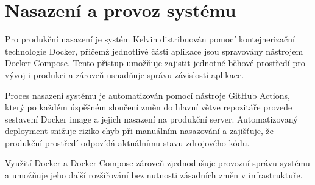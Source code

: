 \section{Nasazení a provoz systému}
\label{sec:kelvin-deployment}

Pro produkční nasazení je systém Kelvin distribuován pomocí kontejnerizační technologie Docker, přičemž jednotlivé části aplikace jsou spravovány nástrojem Docker Compose.
Tento přístup umožňuje zajistit jednotné běhové prostředí pro vývoj i produkci a zároveň usnadňuje správu závislostí aplikace.

Proces nasazení systému je automatizován pomocí nástroje GitHub Actions, který po každém úspěšném sloučení změn do hlavní větve repozitáře provede sestavení Docker image a jejich nasazení na produkční server.
Automatizovaný deployment snižuje riziko chyb při manuálním nasazování a zajišťuje, že produkční prostředí odpovídá aktuálnímu stavu zdrojového kódu.

Využití Docker a Docker Compose zároveň zjednodušuje provozní správu systému a umožňuje jeho další rozšiřování bez nutnosti zásadních změn v infrastruktuře.

\endinput